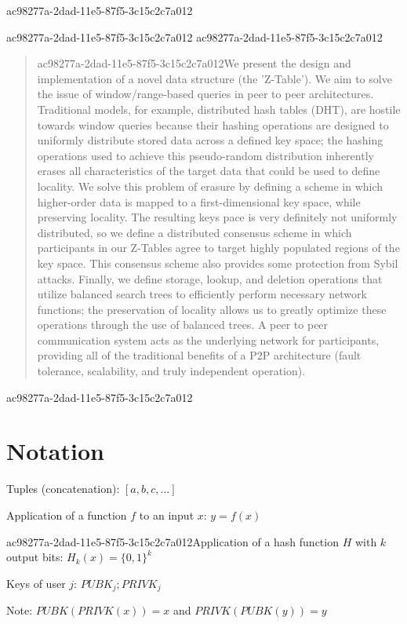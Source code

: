 \documentclass[12pt]{article}
\begin{document}
ac98277a-2dad-11e5-87f5-3c15c2c7a012\maketitle
ac98277a-2dad-11e5-87f5-3c15c2c7a012
ac98277a-2dad-11e5-87f5-3c15c2c7a012\begin{abstract}
ac98277a-2dad-11e5-87f5-3c15c2c7a012We present the design and implementation of a novel data structure (the 'Z-Table'). We aim to solve the issue of window/range-based queries in peer to peer architectures. Traditional models, for example,  distributed hash tables (DHT), are hostile towards window queries because their hashing operations are designed to uniformly distribute stored data across a defined key space; the hashing operations used to achieve this pseudo-random distribution inherently erases all characteristics of the target data that could be used to define locality. We solve this problem of erasure by defining a scheme in which higher-order data is mapped to a first-dimensional key space, while preserving locality. The resulting keys pace is very definitely not uniformly distributed, so we define a distributed consensus scheme in which participants in our Z-Tables agree to target highly populated regions of the key space. This consensus scheme also provides some protection from Sybil attacks. Finally, we define storage, lookup, and deletion operations that utilize balanced search trees to efficiently perform necessary network functions; the preservation of locality allows us to greatly optimize these operations through the use of balanced trees. A peer to peer communication system acts as the underlying network for participants, providing all of the traditional benefits of a P2P architecture (fault tolerance, scalability, and truly independent operation).
\end{abstract}
ac98277a-2dad-11e5-87f5-3c15c2c7a012
\section{Notation}

Tuples (concatenation): $[a,b,c,...]$

Application of a function $f$ to an input $x$: $y=f(x)$

ac98277a-2dad-11e5-87f5-3c15c2c7a012Application of a hash function $H$ with $k$ output bits: $H_{k}(x) = \{0,1\}^k$

Keys of user $j$: $ PUBK_j; PRIVK_j $

Note: $PUBK(PRIVK(x)) = x$ and $PRIVK(PUBK(y)) = y$~
\end{document}
